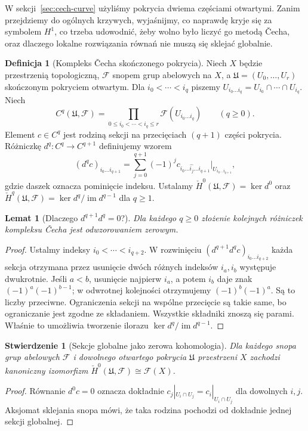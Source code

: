 \documentclass[11pt,a4paper,openany]{report}
\numberwithin{equation}{section}
\theoremstyle{plain}
\newtheorem{lemat}[twierdzenie]{Lemat}
\newtheorem{stwierdzenie}[twierdzenie]{Stwierdzenie}
\theoremstyle{definition}
\newtheorem{definicja}[twierdzenie]{Definicja}
\theoremstyle{remark}
\begin{document}
W sekcji~\ref{sec:cech-curve} użyliśmy pokrycia dwiema częściami
otwartymi. Zanim przejdziemy do ogólnych krzywych, wyjaśnijmy,
co naprawdę kryje się za symbolem $H^1$, co trzeba udowodnić,
żeby wolno było liczyć go metodą Čecha, oraz dlaczego lokalne
rozwiązania równań nie muszą się sklejać globalnie.

\begin{definicja}[Kompleks Čecha skończonego pokrycia]
Niech $X$ będzie przestrzenią topologiczną, $\mathcal F$
snopem grup abelowych na $X$, a
$\mathfrak U=(U_0,\ldots,U_r)$ skończonym pokryciem
otwartym. Dla $i_0<\cdots<i_q$ piszemy
$U_{i_0\ldots i_q}=U_{i_0}\cap\cdots\cap U_{i_q}$.
Niech
\[
 C^q(\mathfrak U,\mathcal F)
 =\prod_{0\le i_0<\cdots<i_q\le r}
       \mathcal F(U_{i_0\ldots i_q})\qquad(q\ge0).
\]
Element $c\in C^q$ jest rodziną sekcji na przecięciach
$(q+1)$ części pokrycia. Różniczkę
$d^q:C^q\to C^{q+1}$ definiujemy wzorem
\[
 (d^qc)_{i_0\ldots i_{q+1}}=
 \sum_{j=0}^{q+1}(-1)^j
 c_{i_0\ldots\widehat{i_j}\ldots i_{q+1}}
 \big|_{U_{i_0\ldots i_{q+1}}},
\]
gdzie daszek oznacza pominięcie indeksu. Ustalamy
$\check H^0(\mathfrak U,\mathcal F)=\ker d^0$ oraz
$\check H^q(\mathfrak U,\mathcal F)
=\ker d^q/\operatorname{im}d^{q-1}$ dla $q\ge1$.
\end{definicja}

\begin{lemat}[Dlaczego $d^{q+1}d^q=0$?]
Dla każdego $q\ge0$ złożenie kolejnych różniczek
kompleksu Čecha jest odwzorowaniem zerowym.
\end{lemat}
\begin{proof}
Ustalmy indeksy $i_0<\cdots<i_{q+2}$. W rozwinięciu
$(d^{q+1}d^qc)_{i_0\ldots i_{q+2}}$ każda sekcja
otrzymana przez usunięcie dwóch różnych indeksów
$i_a,i_b$ występuje dwukrotnie. Jeśli $a<b$, usunięcie
najpierw $i_a$, a potem $i_b$ daje znak
$(-1)^a(-1)^{b-1}$; w odwrotnej kolejności otrzymujemy
$(-1)^b(-1)^a$. Są to liczby przeciwne. Ograniczenia
sekcji na wspólne przecięcie są takie same, bo
ograniczanie jest zgodne ze składaniem. Wszystkie składniki
znoszą się parami. Właśnie to umożliwia tworzenie ilorazu
$\ker d^q/\operatorname{im}d^{q-1}$.
\end{proof}

\begin{stwierdzenie}[Sekcje globalne jako zerowa kohomologia]
Dla każdego snopa grup abelowych $\mathcal F$ i dowolnego
otwartego pokrycia $\mathfrak U$ przestrzeni $X$ zachodzi
kanoniczny izomorfizm
$\check H^0(\mathfrak U,\mathcal F)\cong\mathcal F(X)$.
\end{stwierdzenie}
\begin{proof}
Równanie $d^0c=0$ oznacza dokładnie
$c_j|_{U_i\cap U_j}=c_i|_{U_i\cap U_j}$ dla dowolnych
$i,j$. Aksjomat sklejania snopa mówi, że taka rodzina
pochodzi od dokładnie jednej sekcji globalnej.
\end{proof}
\end{document}
